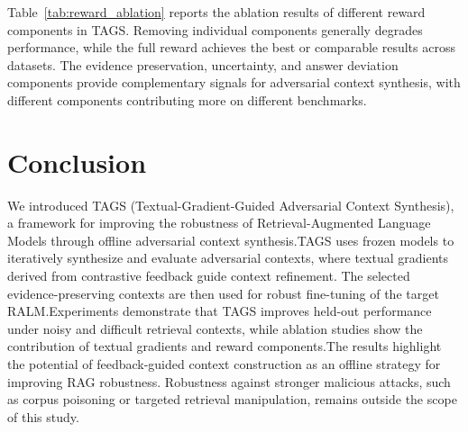\documentclass[11pt]{article}
\begin{document}
Table~\ref{tab:reward_ablation} reports the ablation results of different reward components in TAGS. Removing individual components generally degrades performance, while the full reward achieves the best or comparable results across datasets. 
The evidence preservation, uncertainty, and answer deviation components provide complementary signals for adversarial context synthesis, with different components contributing more on different benchmarks.



\section{Conclusion}
We introduced TAGS (Textual-Gradient-Guided Adversarial Context Synthesis), a framework for improving the robustness of Retrieval-Augmented Language Models through offline adversarial context synthesis.TAGS uses frozen models to iteratively synthesize and evaluate adversarial contexts, where textual gradients derived from contrastive feedback guide context refinement. 
The selected evidence-preserving contexts are then used for robust fine-tuning of the target RALM.Experiments demonstrate that TAGS improves held-out performance under noisy and difficult retrieval contexts, while ablation studies show the contribution of textual gradients and reward components.The results highlight the potential of feedback-guided context construction as an offline strategy for improving RAG robustness. 
Robustness against stronger malicious attacks, such as corpus poisoning or targeted retrieval manipulation, remains outside the scope of this study.


\end{document}
